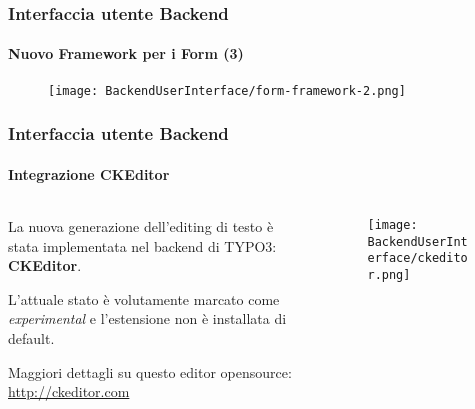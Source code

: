 \begin{frame}[fragile]
	\frametitle{Interfaccia utente Backend}
	\framesubtitle{Nuovo Framework per i Form (3)}

	\begin{figure}
		\texttt{[image: BackendUserInterface/form-framework-2.png]}
	\end{figure}

\end{frame}


\begin{frame}[fragile]
	\frametitle{Interfaccia utente Backend}
	\framesubtitle{Integrazione CKEditor}

	\begin{columns}[T]
		\begin{column}{.5\textwidth}
			La nuova generazione dell'editing di testo è stata implementata nel backend di TYPO3:
			\textbf{CKEditor}.\newline

			L'attuale stato è volutamente marcato come \textit{experimental} e l'estensione 
			non è installata di default.\newline

			Maggiori dettagli su questo editor opensource: \url{http://ckeditor.com}
		\end{column}
		\begin{column}{.5\textwidth}
			\begin{figure}\vspace*{-0.4cm}
				\texttt{[image: BackendUserInterface/ckeditor.png]}
			\end{figure}
		\end{column}
	\end{columns}

\end{frame}



